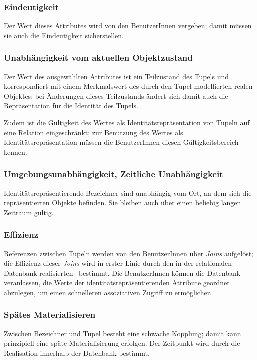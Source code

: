 \subsubsection{Eindeutigkeit}
%
Der Wert dieses Attributes wird von den BenutzerInnen vergeben; damit
m\"{u}ssen sie auch die Eindeutigkeit sicherstellen.
%
\subsubsection{Unabh\"{a}ngigkeit vom aktuellen Objektzustand}
%
Der Wert des ausgew\"{a}hlten Attributes ist ein Teilzustand des Tupels
und korrespondiert mit einem Merkmalswert des durch den Tupel
modellierten realen Objektes; bei \"{A}nderungen dieses Teilzustands
\"{a}ndert sich damit auch die Repr\"{a}sentation f\"{u}r die Identit\"{a}t des
Tupels.
%
\par{}Zudem ist die G\"{u}ltigkeit des Wertes als
Identit\"{a}tsrepr\"{a}sentation von Tupeln auf eine Relation
eingeschr\"{a}nkt; zur Benutzung des Wertes als
Identit\"{a}tsrepr\"{a}sentation m\"{u}ssen die BenutzerInnen diesen
G\"{u}ltigkeitsbereich kennen.
%
\subsubsection{Umgebungsunabh\"{a}ngigkeit, Zeitliche Unabh\"{a}ngigkeit}
%
Identit\"{a}tsrepr\"{a}sentierende Bezeichner sind unabh\"{a}ngig vom
Ort, an dem sich die repr\"{a}sentierten Objekte befinden. Sie bleiben
auch \"{u}ber einen beliebig langen Zeitraum g\"{u}ltig.
%
\subsubsection{Effizienz}
%
Referenzen zwischen Tupeln werden von den BenutzerInnen \"{u}ber
{\em Joins\/} aufgel\"{o}st; die Effizienz dieser {\em Joins\/} wird in
erster Linie durch den in der relationalen Datenbank realisierten
\ bestimmt. Die
BenutzerInnen k\"{o}nnen die Datenbank veranlassen, die Werte der
identit\"{a}tsrepr\"{a}sentierenden Attribute geordnet abzulegen, um einen
schnelleren assoziativen Zugriff zu erm\"{o}glichen.
%
\subsubsection{Sp\"{a}tes Materialisieren}
%
Zwischen Bezeichner und Tupel besteht eine schwache Kopplung; damit
kann prinzipiell eine sp\"{a}te Materialisierung erfolgen. Der Zeitpunkt
wird durch die Realisation innerhalb der Datenbank bestimmt.
%
